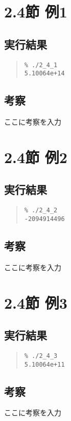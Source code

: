 \documentclass[fontsize=11pt, jafontsize=11pt, paper=a4paper, dvipdfmx]{jlreq}
\begin{document}
\section{2.4節 例1}

\subsection{実行結果}
\label{sec:results3}

\begin{quote}
\begin{verbatim}
% ./2_4_1
5.10064e+14
\end{verbatim}
\end{quote}
%
\subsection{考察}
ここに考察を入力

\section{2.4節 例2}

\subsection{実行結果}
\label{sec:results4}

\begin{quote}
\begin{verbatim}
% ./2_4_2
-2094914496
\end{verbatim}
\end{quote}
%
\subsection{考察}
ここに考察を入力

\section{2.4節 例3}

\subsection{実行結果}
\label{sec:results5}

\begin{quote}
\begin{verbatim}
% ./2_4_3
5.10064e+11
\end{verbatim}
\end{quote}
%
\subsection{考察}
ここに考察を入力
\end{document}
